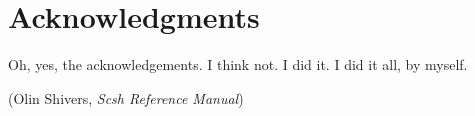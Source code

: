 \chapter*{\label{chap:acknowledgments}Acknowledgments}
Oh, yes, the acknowledgements. I think not. I did it. I did it all, by myself.

(Olin Shivers, \textit{Scsh Reference Manual})